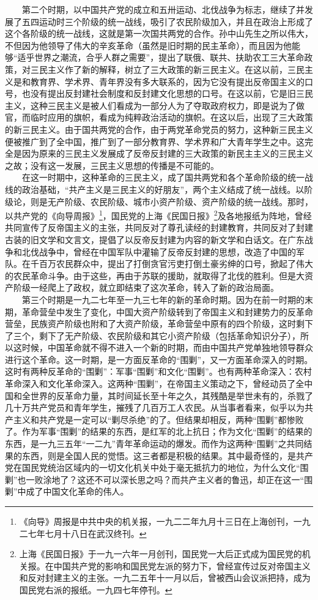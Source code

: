 \documentclass[cn,11pt,chinese]{elegantbook}
\begin{document}
　　第二个时期，以中国共产党的成立和五卅运动、北伐战争为标志，继续了并发展了五四运动时三个阶级的统一战线，吸引了农民阶级加入，并且在政治上形成了这个各阶级的统一战线，这就是第一次国共两党的合作。孙中山先生之所以伟大，不但因为他领导了伟大的辛亥革命（虽然是旧时期的民主革命），而且因为他能够“适乎世界之潮流，合乎人群之需要”，提出了联俄、联共、扶助农工三大革命政策，对三民主义作了新的解释，树立了三大政策的新三民主义。在这以前，三民主义是和教育界、学术界、青年界没有多大联系的，因为它没有提出反帝国主义的口号，也没有提出反封建社会制度和反封建文化思想的口号。在这以前，它是旧三民主义，这种三民主义是被人们看成为一部分人为了夺取政府权力，即是说为了做官，而临时应用的旗帜，看成为纯粹政治活动的旗帜。在这以后，出现了三大政策的新三民主义。由于国共两党的合作，由于两党革命党员的努力，这种新三民主义便被推广到了全中国，推广到了一部分教育界、学术界和广大青年学生之中。这完全是因为原来的三民主义发展成了反帝反封建的三大政策的新民主主义的三民主义之故；没有这一发展，三民主义思想的传播是不可能的。\\
　　在这一时期中，这种革命的三民主义，成了国共两党和各个革命阶级的统一战线的政治基础，“共产主义是三民主义的好朋友”，两个主义结成了统一战线。以阶级论，则是无产阶级、农民阶级、城市小资产阶级、资产阶级的统一战线。那时，以共产党的《向导周报》\footnote[30]{ 《向导》周报是中共中央的机关报，一九二二年九月十三日在上海创刊，一九二七年七月十八日在武汉终刊。}，国民党的上海《民国日报》\footnote[31]{ 上海《民国日报》于一九一六年一月创刊，国民党一大后正式成为国民党的机关报。在中国共产党的影响和国民党左派的努力下，曾经宣传过反对帝国主义和反对封建主义的主张。一九二五年十一月以后，曾被西山会议派把持，成为国民党右派的报纸。一九四七年停刊。}及各地报纸为阵地，曾经共同宣传了反帝国主义的主张，共同反对了尊孔读经的封建教育，共同反对了封建古装的旧文学和文言文，提倡了以反帝反封建为内容的新文学和白话文。在广东战争和北伐战争中，曾经在中国军队中灌输了反帝反封建的思想，改造了中国的军队。在千百万农民群众中，提出了打倒贪官污吏打倒土豪劣绅的口号，掀起了伟大的农民革命斗争。由于这些，再由于苏联的援助，就取得了北伐的胜利。但是大资产阶级一经爬上了政权，就立即结束了这次革命，转入了新的政治局面。\\
　　第三个时期是一九二七年至一九三七年的新的革命时期。因为在前一时期的末期，革命营垒中发生了变化，中国大资产阶级转到了帝国主义和封建势力的反革命营垒，民族资产阶级也附和了大资产阶级，革命营垒中原有的四个阶级，这时剩下了三个，剩下了无产阶级、农民阶级和其它小资产阶级（包括革命知识分子），所以这时候，中国革命就不得不进入一个新的时期，而由中国共产党单独地领导群众进行这个革命。这一时期，是一方面反革命的“围剿”，又一方面革命深入的时期。这时有两种反革命的“围剿”：军事“围剿”和文化“围剿”。也有两种革命深入：农村革命深入和文化革命深入。这两种“围剿”，在帝国主义策动之下，曾经动员了全中国和全世界的反革命力量，其时间延长至十年之久，其残酷是举世未有的，杀戮了几十万共产党员和青年学生，摧残了几百万工人农民。从当事者看来，似乎以为共产主义和共产党是一定可以“剿尽杀绝”的了。但结果却相反，两种“围剿”都惨败了。作为军事“围剿”的结果的东西，是红军的北上抗日；作为文化“围剿”的结果的东西，是一九三五年“一二九”青年革命运动的爆发。而作为这两种“围剿”之共同结果的东西，则是全国人民的觉悟。这三者都是积极的结果。其中最奇怪的，是共产党在国民党统治区域内的一切文化机关中处于毫无抵抗力的地位，为什么文化“围剿”也一败涂地了？这还不可以深长思之吗？而共产主义者的鲁迅，却正在这一“围剿”中成了中国文化革命的伟人。\\
\end{document}
